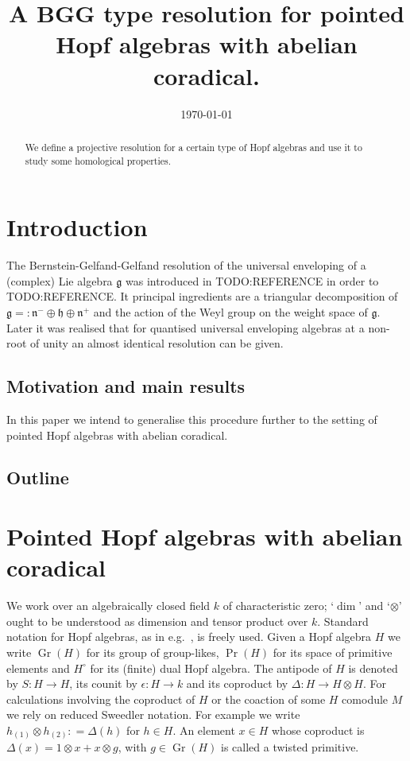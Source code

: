 \documentclass{amsart}
\author{}
\date{\today}
\title{A BGG type resolution for pointed Hopf algebras with abelian coradical.}
\theoremstyle{definition}
\newcommand{\from}{\colon}
\newcommand{\defeq}{{\colon =}}
\newcommand{\eqdef}{{= \colon}}
\DeclareMathOperator{\Gr}{Gr}
\begin{document}
	\begin{abstract}
		We define a projective resolution for a certain type of Hopf algebras and use it to study some homological properties.
	\end{abstract}
	\maketitle

\section{Introduction}
	The Bernstein-Gelfand-Gelfand resolution of the universal enveloping of a (complex) Lie algebra $\mathfrak g$ was introduced in TODO:REFERENCE in order to TODO:REFERENCE. 
	It principal ingredients are a triangular decomposition of $\mathfrak g \eqdef \mathfrak n^- \oplus \mathfrak h \oplus \mathfrak n^+$ and the action of the Weyl group on the weight space of $\mathfrak g$.
	Later it was realised that for quantised universal enveloping algebras at a non-root of unity an almost identical resolution can be given.
	
	\subsection{Motivation and main results}
	
	In this paper we intend to generalise this procedure further to the setting of pointed Hopf algebras with abelian coradical. 
	
	\subsection{Outline}
	
\section{Pointed Hopf algebras with abelian coradical}
	We work over an algebraically closed field $k$ of characteristic zero; `$\dim$' and `$\otimes$' ought to be understood as dimension and tensor product over $k$. 
	Standard notation for Hopf algebras, as in e.g.\ \cite{Montgomery1993,Radford2012}, is freely used. 
	Given a Hopf algebra $H$ we write $\Gr(H)$ for its group of group-likes, $\Pr(H)$ for its space of primitive elements and $H^\circ$ for its (finite) dual Hopf algebra. 
	The antipode of $H$ is denoted by   $S\from H \to H$, its counit by $\epsilon \from H \to k$ and its coproduct by $\Delta \from H \to H\otimes H$. 
	For calculations involving the coproduct of $H$ or the coaction of some $H$ comodule $M$ we rely on reduced Sweedler notation. 
	For example we  write $h_{(1)} \otimes h_{(2)} \defeq \Delta (h)$ for $h \in H$.
	An element $x\in H$ whose coproduct is $\Delta(x) = 1 \otimes x + x \otimes g$, with $g\in \Gr(H)$ is called a twisted primitive.
	\\
	
\end{document}
